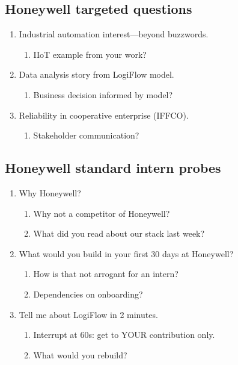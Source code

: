 \documentclass[9pt,a4paper]{article}
\begin{document}
\subsection{Honeywell targeted questions}
\begin{enumerate}[label=\textbf{Q\arabic*:}, leftmargin=*]
  \item Industrial automation interest---beyond buzzwords.
  \begin{enumerate}[label=\textit{FU\arabic*:}, leftmargin=2em]
    \item IIoT example from your work?
  \end{enumerate}
  \item Data analysis story from LogiFlow model.
  \begin{enumerate}[label=\textit{FU\arabic*:}, leftmargin=2em]
    \item Business decision informed by model?
  \end{enumerate}
  \item Reliability in cooperative enterprise (IFFCO).
  \begin{enumerate}[label=\textit{FU\arabic*:}, leftmargin=2em]
    \item Stakeholder communication?
  \end{enumerate}
\end{enumerate}
\subsection{Honeywell standard intern probes}
\begin{enumerate}[label=\textbf{Q\arabic*:}, leftmargin=*]
  \item Why Honeywell?
  \begin{enumerate}[label=\textit{FU\arabic*:}, leftmargin=2em]
    \item Why not a competitor of Honeywell?
    \item What did you read about our stack last week?
  \end{enumerate}
  \item What would you build in your first 30 days at Honeywell?
  \begin{enumerate}[label=\textit{FU\arabic*:}, leftmargin=2em]
    \item How is that not arrogant for an intern?
    \item Dependencies on onboarding?
  \end{enumerate}
  \item Tell me about LogiFlow in 2 minutes.
  \begin{enumerate}[label=\textit{FU\arabic*:}, leftmargin=2em]
    \item Interrupt at 60s: get to YOUR contribution only.
    \item What would you rebuild?
  \end{enumerate}
\end{enumerate}
\newpage
\end{document}
